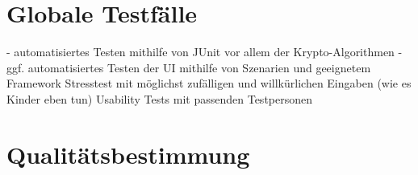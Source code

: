 \documentclass{article}
\begin{document}
\section{Globale Testfälle}
- automatisiertes Testen mithilfe von JUnit vor allem der Krypto-Algorithmen
- ggf. automatisiertes Testen der UI mithilfe von Szenarien und geeignetem Framework
Stresstest mit möglichst zufälligen und willkürlichen Eingaben (wie es Kinder eben tun)
Usability Tests mit passenden Testpersonen

\section{Qualitätsbestimmung}
\end{document}
